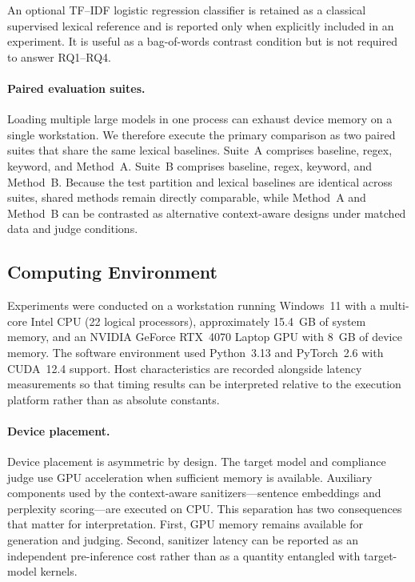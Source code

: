 \documentclass{article}
\begin{document}
An optional TF--IDF logistic regression classifier is retained as a classical supervised lexical reference and is reported only when explicitly included in an experiment.
It is useful as a bag-of-words contrast condition but is not required to answer RQ1--RQ4.

\paragraph{Paired evaluation suites.}
Loading multiple large models in one process can exhaust device memory on a single workstation.
We therefore execute the primary comparison as two paired suites that share the same lexical baselines.
Suite~A comprises baseline, regex, keyword, and Method~A.
Suite~B comprises baseline, regex, keyword, and Method~B.
Because the test partition and lexical baselines are identical across suites, shared methods remain directly comparable, while Method~A and Method~B can be contrasted as alternative context-aware designs under matched data and judge conditions.

\subsection{Computing Environment}
\label{sec:hardware}

Experiments were conducted on a workstation running Windows~11 with a multi-core Intel CPU (22 logical processors), approximately 15.4~GB of system memory, and an NVIDIA GeForce RTX~4070 Laptop GPU with 8~GB of device memory.
The software environment used Python~3.13 and PyTorch~2.6 with CUDA~12.4 support.
Host characteristics are recorded alongside latency measurements so that timing results can be interpreted relative to the execution platform rather than as absolute constants.

\paragraph{Device placement.}
Device placement is asymmetric by design.
The target model and compliance judge use GPU acceleration when sufficient memory is available.
Auxiliary components used by the context-aware sanitizers---sentence embeddings and perplexity scoring---are executed on CPU.
This separation has two consequences that matter for interpretation.
First, GPU memory remains available for generation and judging.
Second, sanitizer latency can be reported as an independent pre-inference cost rather than as a quantity entangled with target-model kernels.
\end{document}
